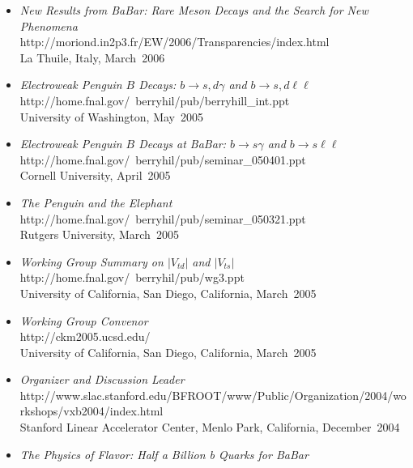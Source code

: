 \documentclass [12pt]{report}
\begin{document}
\begin{itemize}
{University of California, Irvine, California, June~2006}
\item{{\em New Results from BaBar:  Rare Meson Decays and the Search for New Phenomena}\\ 
{http://moriond.in2p3.fr/EW/2006/Transparencies/index.html}\\
La Thuile, Italy, March~2006}
\item{{\em Electroweak Penguin $B$ Decays:  $b\rightarrow s,d\gamma$ and $b\rightarrow s,d\ell\ell$}\\ 
{http://home.fnal.gov/~berryhil/pub/berryhill_int.ppt}\\
University of Washington, May~2005}
\item{{\em Electroweak Penguin $B$ Decays at BaBar:  $b\rightarrow s\gamma$ and $b\rightarrow s\ell\ell$}\\ 
{http://home.fnal.gov/~berryhil/pub/seminar_050401.ppt}\\
Cornell University, April~2005}
\item{{\em The Penguin and the Elephant}\\ 
{http://home.fnal.gov/~berryhil/pub/seminar_050321.ppt}\\
Rutgers University, March~2005}
\item{{\em Working Group Summary on $|V_{td}|$ and $|V_{ts}|$ }\\ 
{http://home.fnal.gov/~berryhil/pub/wg3.ppt}\\
University of California, San Diego, California, March~2005}
\item{{\em Working Group Convenor}\\ 
{http://ckm2005.ucsd.edu/}\\
University of California, San Diego, California, March~2005}
\item{{\em Organizer and Discussion Leader}\\ 
{http://www.slac.stanford.edu/BFROOT/www/Public/Organization/2004/workshops/vxb2004/index.html}\\
Stanford Linear Accelerator Center, Menlo Park, California, December~2004}
\item{{\em The Physics of Flavor:  Half a Billion b Quarks for BaBar}\\ 
}
\end{itemize}
\end{document}
